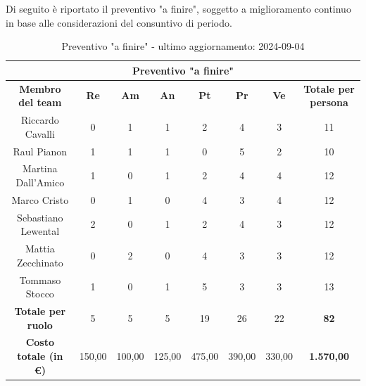 \begin{minipage}{\textwidth}
Di seguito è riportato il preventivo "a finire", soggetto a miglioramento continuo in base alle considerazioni del consuntivo di periodo.
\begin{table}[H]
  \centering
  \begin{adjustbox}{max width=\textwidth}
  \begin{tabular}{|c|c|c|c|c|c|c|c|}
    \hline
    \multicolumn{8}{|c|}{\textbf{Preventivo "a finire"}} \\
    \hline
    \textbf{Membro del team} & \textbf{Re} & \textbf{Am} & \textbf{An} & \textbf{Pt} & \textbf{Pr} & \textbf{Ve} & \textbf{Totale per persona} \\
    \hline
    Riccardo Cavalli & 0 & 1 & 1 & 2 & 4 & 3 & 11 \\
    \hline
    Raul Pianon & 1 & 1 & 1 & 0 & 5 & 2 & 10 \\
    \hline
    Martina Dall'Amico & 1 & 0 & 1 & 2 & 4 & 4 & 12 \\
    \hline
    Marco Cristo & 0 & 1 & 0 & 4 & 3 & 4 & 12 \\
    \hline
    Sebastiano Lewental & 2 & 0 & 1 & 2 & 4 & 3 & 12 \\
    \hline
    Mattia Zecchinato & 0 & 2 & 0 & 4 & 3 & 3 & 12 \\
    \hline
    Tommaso Stocco & 1 & 0 & 1 & 5 & 3 & 3 & 13 \\
    \hline
    \textbf{Totale per ruolo} & 5 & 5 & 5 & 19 & 26 & 22 & \textbf{82} \\
    \hline
    \textbf{Costo totale (in €)} & 150,00 & 100,00 & 125,00 & 475,00 & 390,00 & 330,00 & \textbf{1.570,00} \\
    \hline
  \end{tabular}
  \end{adjustbox}
  \caption{Preventivo "a finire" - ultimo aggiornamento: 2024-09-04}\label{tab:preventivo-a-finire}
\end{table}
\end{minipage}
